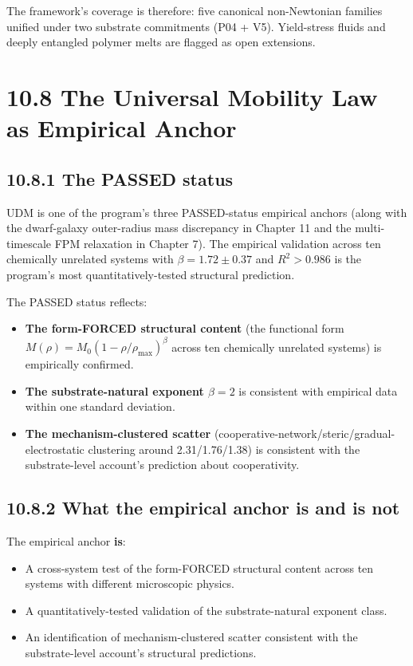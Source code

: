 \documentclass[11pt]{book}
\begin{document}
The framework's coverage is therefore: five canonical non-Newtonian families unified under two substrate commitments (P04 + V5). Yield-stress fluids and deeply entangled polymer melts are flagged as open extensions.

\section{10.8 The Universal Mobility Law as Empirical Anchor}

\subsection{10.8.1 The PASSED status}

UDM is one of the program's three PASSED-status empirical anchors (along with the dwarf-galaxy outer-radius mass discrepancy in Chapter 11 and the multi-timescale FPM relaxation in Chapter 7). The empirical validation across ten chemically unrelated systems with $\beta = 1.72 \pm 0.37$ and $R^2 > 0.986$ is the program's most quantitatively-tested structural prediction.

The PASSED status reflects:
\begin{itemize}
\item \textbf{The form-FORCED structural content} (the functional form $M(\rho) = M_0(1-\rho/\rho_\mathrm{max})^\beta$ across ten chemically unrelated systems) is empirically confirmed.
\item \textbf{The substrate-natural exponent $\beta = 2$} is consistent with empirical data within one standard deviation.
\item \textbf{The mechanism-clustered scatter} (cooperative-network/steric/gradual-electrostatic clustering around 2.31/1.76/1.38) is consistent with the substrate-level account's prediction about cooperativity.
\end{itemize}

\subsection{10.8.2 What the empirical anchor is and is not}

The empirical anchor \textbf{is}:
\begin{itemize}
\item A cross-system test of the form-FORCED structural content across ten systems with different microscopic physics.
\item A quantitatively-tested validation of the substrate-natural exponent class.
\item An identification of mechanism-clustered scatter consistent with the substrate-level account's structural predictions.
\end{itemize}
\end{document}
